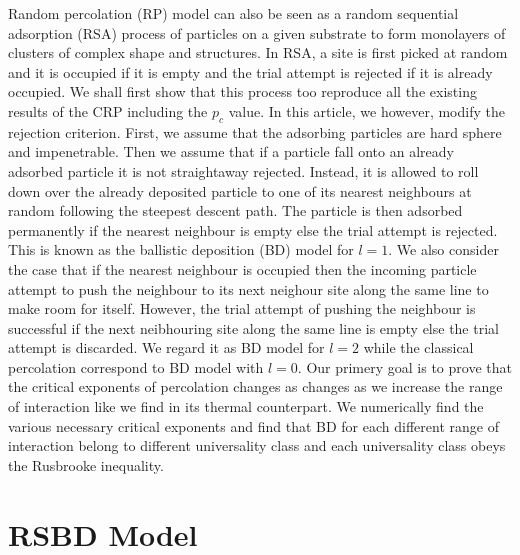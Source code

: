 \documentclass[twocolumn,showpacs,preprintnumbers,amsmath,amssymb]{article}
\begin{document}
Random percolation (RP) model can also be seen as a random sequential adsorption (RSA) process of particles on a given 
substrate to form
monolayers of clusters of complex shape and structures. In RSA, a site is first picked at random and it is occupied
if it is empty and the trial attempt is rejected if it is already occupied.
We shall first show that this process too reproduce all the existing results of the CRP 
including the $p_c$ value. In this article, we however, modify the rejection criterion. First,
 we assume that the adsorbing
particles are hard sphere and impenetrable. Then we assume that if a 
particle fall onto an already adsorbed particle it is not straightaway rejected. Instead, it is allowed to roll down 
over the already deposited
particle to one of its nearest neighbours at random following the steepest descent path. 
The particle is then adsorbed permanently if the nearest neighbour is empty 
else the trial attempt is rejected. This is known as the ballistic deposition (BD) model for $l=1$. We also consider
the case that if the nearest neighbour is occupied then the incoming particle attempt to push the neighbour
to its next neighour site along the same line to make room for itself. However, the trial attempt of pushing 
the neighbour is successful if the next neibhouring site along the same line is empty else the trial
attempt is discarded. We regard it as BD model for $l=2$ while the classical percolation correspond to BD
model with $l=0$. Our primery goal is to prove that the critical exponents of percolation changes
as changes as we increase the range of interaction like we find in its thermal counterpart. We numerically 
find the various necessary critical exponents and find that BD for each different range of interaction 
belong to different universality class and each universality class obeys the Rusbrooke inequality.  

\section{RSBD Model}
\end{document}
